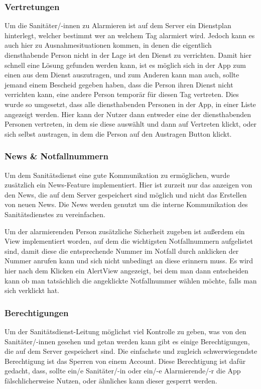     \subsubsection{Vertretungen}
    Um die Sanitäter/-innen zu Alarmieren ist auf dem Server ein Dienstplan hinterlegt, welcher bestimmt wer an welchem Tag alarmiert wird. 
    Jedoch kann es auch hier zu Ausnahmesituationen kommen, in denen die eigentlich diensthabende Person nicht in der Lage ist den Dienst zu verrichten.
    Damit hier schnell eine Lösung gefunden werden kann, ist es möglich sich in der App zum einen aus dem Dienst auszutragen, und zum Anderen kann man auch, sollte jemand einem Bescheid gegeben haben, dass
    die Person ihren Dienst nicht verrichten kann, eine andere Person temporär für diesen Tag vertreten.
    Dies wurde so umgesetzt, dass alle diensthabenden Personen in der App, in einer Liste angezeigt werden. Hier kann der Nutzer dann entweder eine der diensthabenden Personen
    vertreten, in dem sie diese auswählt und dann auf Vertreten klickt, oder sich selbst austragen, in dem die Person auf den \glqq Austragen \grqq Button klickt.
    \subsubsection{News \& Notfallnummern}
    Um dem Sanitätsdienst eine gute Kommunikation zu ermöglichen, wurde zusätzlich ein News-Feature implementiert. Hier ist zurzeit nur das anzeigen von den News, die auf 
    dem Server gespeichert sind möglich und nicht das Erstellen von neuen News. Die News werden genutzt um die interne Kommunikation des Sanitätsdienstes zu vereinfachen.

    \noindent Um der alarmierenden Person zusätzliche Sicherheit zugeben ist außerdem ein View implementiert worden, auf dem die wichtigsten Notfallnummern aufgelistet sind,
    damit diese die entsprechende Nummer im Notfall durch anklicken der Nummer anrufen kann und sich nicht unbedingt an diese erinnern muss.
    Es wird hier nach dem Klicken ein AlertView angezeigt, bei dem man dann entscheiden kann ob man tatsächlich die angeklickte Notfallnummer wählen möchte, falls man sich verklickt hat.
    
    \subsubsection{Berechtigungen}
    Um der Sanitätsdienst-Leitung möglichst viel Kontrolle zu geben, was von den Sanitäter/-innen gesehen und getan werden kann gibt es einige Berechtigungen, die auf dem Server gespeichert sind.
    Die einfachste und zugleich schwerwiegendste Berechtigung ist das Sperren von einem Account. Diese Berechtigung ist dafür gedacht, dass, sollte ein/e Sanitäter/-in oder ein/-e Alarmierende/-r die App
    fälschlicherweise Nutzen, oder ähnliches kann dieser gesperrt werden.

